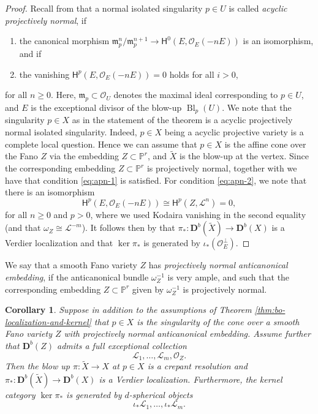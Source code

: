 \documentclass[a4paper,11pt, reqno]{amsart}
\def\P{\mathbb P}
\def\DD{\mathbf D}
\def\OO{\mathcal O}
\def\mm{\mathfrak m}
\def\sL{\mathscr{L}}
\def\Bl{{\operatorname{Bl}}}
\def\Db{\DD^b}
\newcommand{\bH}{\mathsf{H}}
\theoremstyle{plain}
\newtheorem{corollary}[dummy]{Corollary}
\theoremstyle{definition}
\numberwithin{equation}{section}
\begin{document}
\begin{proof}
    Recall from \cite[Definition 5.3]{ks} that a normal isolated singularity $p \in U$ is called \emph{acyclic projectively normal}, if
    \begin{enumerate}
        \item\label{eq:apn-1} the canonical morphism $\mm^n_{p} / \mm^{n+1}_{p} \to \bH^0 ( E , \OO_E (-nE) )$ is an isomorphism, and if
        \item\label{eq:apn-2}  the vanishing $\bH^p ( E , \OO_E (-n E ) ) = 0$ holds for all $i > 0$,
    \end{enumerate}
    for all $n \geq 0$. 
    Here, $\mm_{p} \subset \OO_U$ denotes the maximal ideal corresponding to $p \in U$, and $E $ is the exceptional divisor of the blow-up $\Bl_p (U)$. 
    We note that the singularity $p\in X$ as in the statement of the theorem
    is a acyclic projectively normal isolated singularity. 
    Indeed, $p \in X$ being a acyclic projective variety is a complete local question. Hence we can assume that $p \in X$ is the affine cone over the Fano $Z$ via the embedding $Z \subset \P^r$, and $\tilde{X}$ is the blow-up at the vertex.
    Since the corresponding embedding $Z \subset \P^r$ is projectively normal, together with \cite[Chapter II, Exercise 5.14]{hartshorne} we have that condition \eqref{eq:apn-1} is satisfied.
    For condition \eqref{eq:apn-2}, we note that there is an isomorphism
    \[
    \bH^p ( E , \OO_E ( -n E) ) \cong \bH^p ( Z , \sL^n )  = 0, 
    \]
    for all $n \geq 0$ and $p > 0$, where we used Kodaira vanishing in the second equality (and that $\omega_Z \cong \sL^{-m}$).
    It follows then by \cite[Corollary 5.6]{ks} that $\pi_\ast : \Db(\tilde{X} ) \to \Db(X)$ is a Verdier localization and that $\ker  \pi_\ast $ is generated by 
       $\iota_\ast ( \OO_E^{\perp} ) $.
\end{proof}

We say that a smooth Fano variety $Z$ has \emph{projectively normal anticanonical embedding}, if
 the anticanonical bundle  $\omega_Z^{-1}$ is very ample, and such that the corresponding  embedding $Z \subset \P^r$ given by $\omega_Z^{-1}$ is projectively normal.


\begin{corollary}\label{cor:bo-localization-anticanonical}
    Suppose in addition to the assumptions of Theorem \ref{thm:bo-localization-and-kernel} that $p \in X$ is the singularity of the cone over a smooth Fano variety $Z$ with projectively normal anticanonical embedding.
    Assume further that $\Db(Z)$ admits a full exceptional collection 
    \[
    \sL_1 , \ldots , \sL_m , \OO_Z .
    \]
    Then the blow up $\pi \colon \tilde{X} \to X$ at $p \in X$ is a crepant resolution and $\pi_\ast \colon \Db( \tilde{X} ) \to \Db(X)$ is a Verdier localization.
    Furthermore, the kernel category $\ker \pi_\ast$ is generated by $d$-spherical objects
    \[
    \iota_\ast \sL_1 , \ldots , \iota_\ast \sL_m .
    \]
\end{corollary}
\end{document}
